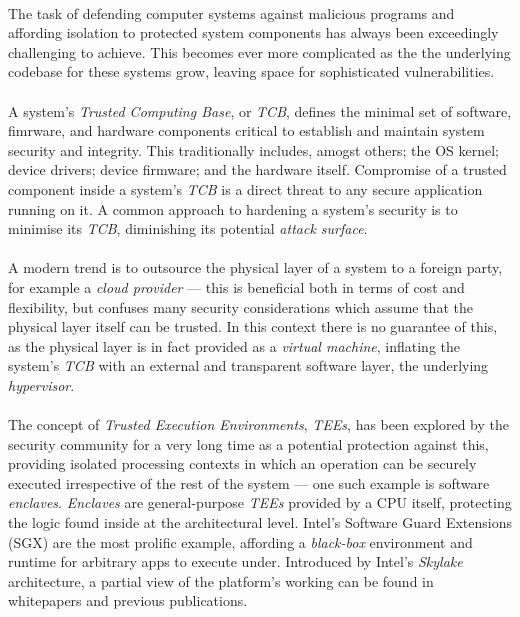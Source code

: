 


\paragraph{} The task of defending computer systems against malicious programs and affording isolation to protected system components has always been exceedingly challenging to achieve. This becomes ever more complicated as the the underlying codebase for these systems grow, leaving space for sophisticated vulnerabilities. 

\paragraph{} A system's \textit{Trusted Computing Base}, or \textit{TCB}, defines the minimal set of software, fimrware, and hardware components critical to establish and maintain system security and integrity. This traditionally includes, amogst others; the OS kernel; device drivers; device firmware; and the hardware itself. Compromise of a trusted component inside a system's \textit{TCB} is a direct threat to any secure application running on it. A common approach to hardening a system's security is to minimise its \textit{TCB}, diminishing its potential \textit{attack surface}. 

\paragraph{} A modern trend is to outsource the physical layer of a system to a foreign party, for example a \textit{cloud provider} --- this is beneficial both in terms of cost and flexibility, but confuses many security considerations which assume that the physical layer itself can be trusted. In this context there is no guarantee of this, as the physical layer is in fact provided as a \textit{virtual machine}, inflating the system's \textit{TCB} with an external and transparent software layer, the underlying \textit{hypervisor}.

\paragraph{} The concept of \textit{Trusted Execution Environments}, \textit{TEEs}, has been explored by the security community for a very long time as a potential protection against this, providing isolated processing contexts in which an operation can be securely executed irrespective of the rest of the system --- one such example is software \textit{enclaves}. \textit{Enclaves} are general-purpose \textit{TEEs} provided by a CPU itself, protecting the logic found inside at the architectural level. Intel's Software Guard Extensions (SGX) are the most prolific example, affording a \textit{black-box} environment and runtime for arbitrary apps to execute under. Introduced by Intel's \textit{Skylake} architecture, a partial view of the platform's working can be found in whitepapers and previous publications.

